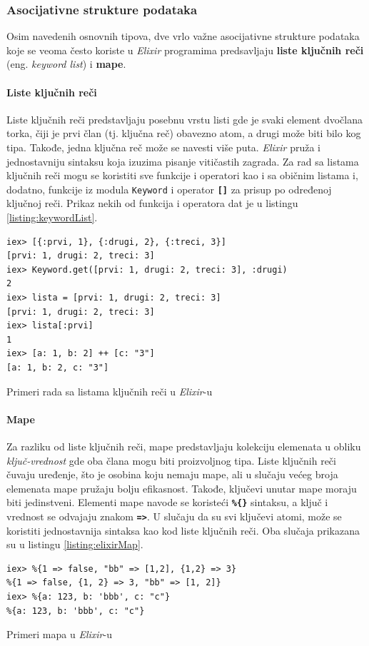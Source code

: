\documentclass[12pt,oneside]{memoir}
\begin{document}
\subsubsection{Asocijativne strukture podataka}
Osim navedenih osnovnih tipova, dve vrlo važne asocijativne strukture podataka koje se 
veoma često koriste u \emph{Elixir} programima predsavljaju \textbf{liste ključnih reči} (eng.
\emph{keyword list}) i \textbf{mape}.
\paragraph{Liste ključnih reči}
Liste ključnih reči predstavljaju posebnu vrstu listi gde je svaki element dvočlana torka,
čiji je prvi član (tj. ključna reč) obavezno atom, a drugi može biti bilo kog tipa. Takođe,
jedna ključna reč može se navesti više puta. \emph{Elixir} pruža i jednostavniju sintaksu koja izuzima
pisanje vitičastih zagrada. Za rad sa listama ključnih reči mogu se koristiti sve funkcije i
operatori kao i sa običnim listama i, dodatno, funkcije iz modula \texttt{Keyword} i operator
\texttt{\textbf{[\smallskip]}} za prisup po određenoj ključnoj reči. Prikaz nekih od funkcija i operatora
dat je u listingu \ref{listing:keywordList}.
\begin{listing}[!h]
\begin{verbatim}
iex> [{:prvi, 1}, {:drugi, 2}, {:treci, 3}]
[prvi: 1, drugi: 2, treci: 3]
iex> Keyword.get([prvi: 1, drugi: 2, treci: 3], :drugi)
2
iex> lista = [prvi: 1, drugi: 2, treci: 3]
[prvi: 1, drugi: 2, treci: 3]
iex> lista[:prvi]
1
iex> [a: 1, b: 2] ++ [c: "3"]
[a: 1, b: 2, c: "3"]
\end{verbatim}
\caption{Primeri rada sa listama ključnih reči u \emph{Elixir}-u}
\label{listing:keywordList}
\end{listing}

\paragraph{Mape}
Za razliku od liste ključnih reči, mape predstavljaju kolekciju elemenata u obliku
\emph{ključ-vrednost} gde oba člana mogu biti proizvoljnog tipa. Liste ključnih
reči čuvaju uređenje, što je osobina koju nemaju mape, ali u slučaju većeg broja elemenata
mape pružaju bolju efikasnost. Takođe, ključevi unutar mape moraju biti jedinstveni.
Elementi mape navode se koristeći \texttt{\textbf{\%\{\}}} sintaksu, a ključ i vrednost se
odvajaju znakom \texttt{\textbf{=>}}. U slučaju da su svi ključevi atomi, može se koristiti
jednostavnija sintaksa kao kod liste ključnih reči. Oba slučaja prikazana su u listingu 
\ref{listing:elixirMap}.
\begin{listing}[!h]
\begin{verbatim}
iex> %{1 => false, "bb" => [1,2], {1,2} => 3}
%{1 => false, {1, 2} => 3, "bb" => [1, 2]}
iex> %{a: 123, b: 'bbb', c: "c"}
%{a: 123, b: 'bbb', c: "c"}
\end{verbatim}
\caption{Primeri mapa u \emph{Elixir}-u}
\label{listing:elixirMap}
\end{listing}
\end{document}
